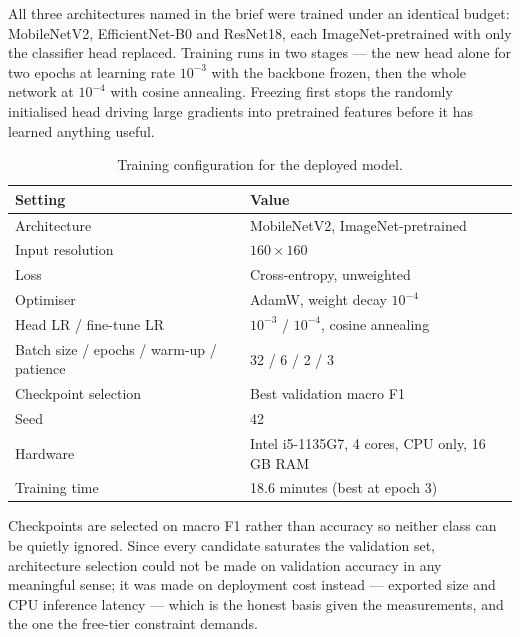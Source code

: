 \documentclass[10pt,a4paper]{article}
\begin{document}
All three architectures named in the brief were trained under an identical budget:
MobileNetV2, EfficientNet-B0 and ResNet18, each ImageNet-pretrained with only the
classifier head replaced. Training runs in two stages --- the new head alone for two
epochs at learning rate $10^{-3}$ with the backbone frozen, then the whole network at
$10^{-4}$ with cosine annealing. Freezing first stops the randomly initialised head
driving large gradients into pretrained features before it has learned anything useful.

\begin{table}[H]
\centering\small
\caption{Training configuration for the deployed model.}
\begin{tabular}{ll}
\toprule
\textbf{Setting} & \textbf{Value} \\
\midrule
Architecture & MobileNetV2, ImageNet-pretrained \\
Input resolution & $160\times160$ \\
Loss & Cross-entropy, unweighted \\
Optimiser & AdamW, weight decay $10^{-4}$ \\
Head LR / fine-tune LR & $10^{-3}$ / $10^{-4}$, cosine annealing \\
Batch size / epochs / warm-up / patience & 32 / 6 / 2 / 3 \\
Checkpoint selection & Best validation macro F1 \\
Seed & 42 \\
Hardware & Intel i5-1135G7, 4 cores, CPU only, 16\,GB RAM \\
Training time & 18.6 minutes (best at epoch 3) \\
\bottomrule
\end{tabular}
\end{table}

Checkpoints are selected on macro F1 rather than accuracy so neither class can be
quietly ignored. Since every candidate saturates the validation set, architecture
selection could not be made on validation accuracy in any meaningful sense; it was made
on deployment cost instead --- exported size and CPU inference latency --- which is the
honest basis given the measurements, and the one the free-tier constraint demands.
\end{document}
